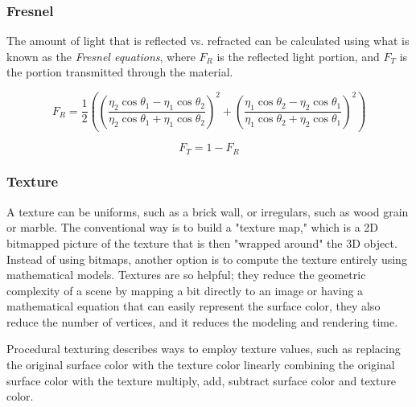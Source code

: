 \documentclass{article}
\begin{document}
	\subsubsection{Fresnel}
	The amount of light that is reflected vs. refracted can be calculated using what is known as the \textit{Fresnel equations}, where $F_R$ is the reflected light portion, and $F_T$ is the portion transmitted through the material. 
	
	\begin{equation}
		F_R = \dfrac{1}{2}(\left( \dfrac{\eta_2 \cos\theta_1 - \eta_1 \cos \theta_2}{\eta_2 \cos\theta_1 + \eta_1 \cos \theta_2} \right)^2 + \left( \dfrac{\eta_1 \cos\theta_2 - \eta_2 \cos \theta_1}{\eta_1 \cos\theta_2 + \eta_2 \cos \theta_1} \right)^2)
	\end{equation}
	
	
	
	\begin{equation}
		F_T= 1 - F_R 
	\end{equation}
	
	\subsubsection{Texture}
	A texture can be uniforms, such as a brick wall, or irregulars, such as wood grain or marble. The conventional way is to build a "texture map," which is a 2D bitmapped picture of the texture that is then "wrapped around" the 3D object. Instead of using bitmaps, another option is to compute the texture entirely using mathematical models. Textures are so helpful; they reduce the geometric complexity of a scene by mapping a bit directly to an image or having a mathematical equation that can easily represent the surface color, they also reduce the number of vertices, and it reduces the modeling and rendering time. 
	
	Procedural texturing describes ways to employ texture values, such as replacing the original surface color with the texture color linearly combining the original surface color with the texture multiply, add, subtract surface color and texture color.
	
\end{document}
